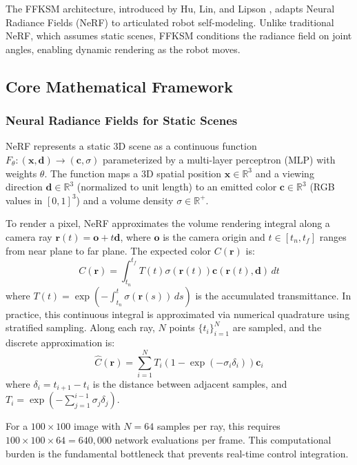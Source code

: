 \documentclass[12pt,a4paper,oneside]{report}
\begin{document}
The FFKSM architecture, introduced by Hu, Lin, and Lipson \cite{hu2024teaching}, adapts Neural Radiance Fields (NeRF) \cite{mildenhall2020nerf} to articulated robot self-modeling. Unlike traditional NeRF, which assumes static scenes, FFKSM conditions the radiance field on joint angles, enabling dynamic rendering as the robot moves.

\subsection{Core Mathematical Framework}

\subsubsection{Neural Radiance Fields for Static Scenes}

NeRF represents a static 3D scene as a continuous function $F_\theta: (\mathbf{x}, \mathbf{d}) \rightarrow (\mathbf{c}, \sigma)$ parameterized by a multi-layer perceptron (MLP) with weights $\theta$. The function maps a 3D spatial position $\mathbf{x} \in \mathbb{R}^3$ and a viewing direction $\mathbf{d} \in \mathbb{R}^3$ (normalized to unit length) to an emitted color $\mathbf{c} \in \mathbb{R}^3$ (RGB values in $[0,1]^3$) and a volume density $\sigma \in \mathbb{R}^+$.

To render a pixel, NeRF approximates the volume rendering integral along a camera ray $\mathbf{r}(t) = \mathbf{o} + t\mathbf{d}$, where $\mathbf{o}$ is the camera origin and $t \in [t_n, t_f]$ ranges from near plane to far plane. The expected color $C(\mathbf{r})$ is:
\begin{equation}
C(\mathbf{r}) = \int_{t_n}^{t_f} T(t) \sigma(\mathbf{r}(t)) \mathbf{c}(\mathbf{r}(t), \mathbf{d}) \, dt
\end{equation}
where $T(t) = \exp\left(-\int_{t_n}^{t} \sigma(\mathbf{r}(s)) \, ds\right)$ is the accumulated transmittance. In practice, this continuous integral is approximated via numerical quadrature using stratified sampling. Along each ray, $N$ points $\{t_i\}_{i=1}^N$ are sampled, and the discrete approximation is:
\begin{equation}
\hat{C}(\mathbf{r}) = \sum_{i=1}^{N} T_i (1 - \exp(-\sigma_i \delta_i)) \mathbf{c}_i
\end{equation}
where $\delta_i = t_{i+1} - t_i$ is the distance between adjacent samples, and $T_i = \exp\left(-\sum_{j=1}^{i-1} \sigma_j \delta_j\right)$.

For a $100 \times 100$ image with $N = 64$ samples per ray, this requires $100 \times 100 \times 64 = 640,000$ network evaluations per frame. This computational burden is the fundamental bottleneck that prevents real-time control integration.
\end{document}
